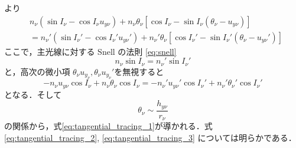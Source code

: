 \documentclass{jsarticle}
\begin{document}
より
\begin{equation}
    \begin{aligned}
        &n_\nu(\sin I_\nu-\cos I_\nu u_{y\nu})+n_\nu\theta_\nu[\cos I_\nu -\sin I_\nu (\theta_\nu-u_{y\nu})]\\
        &=n_\nu'(\sin I_\nu'-\cos I_\nu' u_{y\nu}')+n_\nu'\theta_\nu[\cos I_\nu' -\sin I_\nu' (\theta_\nu-u_{y\nu}')]
    \end{aligned}
\end{equation}
ここで，主光線に対する Snell の法則 \eqref{eq:snell}
\begin{equation}
    n_\nu\sin I_\nu=n_\nu'\sin I_\nu'
\end{equation}
と，高次の微小項 $\theta_\nu u_{y_\nu}, \theta_\nu u_{y_\nu}'$を無視すると
\begin{equation}
    -n_\nu u_{y\nu}\cos I_\nu + n_\nu\theta_\nu\cos I_\nu
    =-n_\nu' u_{y\nu}'\cos I_\nu' + n_\nu'\theta_\nu'\cos I_\nu'
\end{equation}
となる．そして
\begin{equation}
    \theta_\nu\sim \frac{h_{y\nu}}{r_\nu}
\end{equation}
の関係から，式\eqref{eq:tangential_tracing_1}が導かれる．式 \eqref{eq:tangential_tracing_2}, \eqref{eq:tangential_tracing_3} については明らかである．
\end{document}
